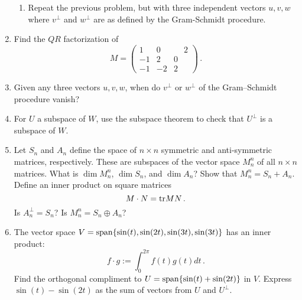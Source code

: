 \begin{enumerate}
\begin{enumerate}
\item Repeat the previous problem, but with three independent vectors $u,v,w$
 where $v^\perp$ and $w^\perp$ are as defined by the Gram-Schmidt procedure. 
\end{enumerate}



\item \label{QRprob} Find the $QR$ factorization of
$$
M=\begin{pmatrix}1&0&\phantom{\!-}2\\-1&2&0\\-1&-2&2
\end{pmatrix}\, .
$$


\item Given any three vectors $u,v,w$, when do $v^\perp$ or $w^\perp$ of the Gram--Schmidt procedure vanish?


\item For $U$ a subspace of $W$, use the subspace theorem to check that $U^\perp$ is a subspace of $W$.




\item %
Let $S_n$ and $A_n$ define the space of $n \times n$ symmetric and anti-symmetric matrices, respectively. These are subspaces of the vector space $M^n_n$ of all $n\times n$ matrices. What is $\dim M^n_n$, $\dim S_n$, and $\dim A_n$? Show that $M^n_n = S_n + A_n$. Define an inner product on square matrices
$$
M\cdot N ={\rm tr} MN\, .
$$
Is $A_n^{\perp}=S_n$? Is $M^n_n = S_n \oplus A_n$?


\item The vector space $V={\rm span} \{ \sin(t),\sin(2t), \sin(3t) , \sin(3t)\}$ has an inner product: 
$$f\cdot g:=\int _0^{2\pi}f(t)g(t) dt\, .$$ Find the orthogonal compliment to $U={\rm span} \{ \sin(t)+\sin(2t) \}$ in $V$. Express $\sin(t)-\sin(2t)$ as  the sum of vectors from $U$ and $U^\perp$.

\end{enumerate}

